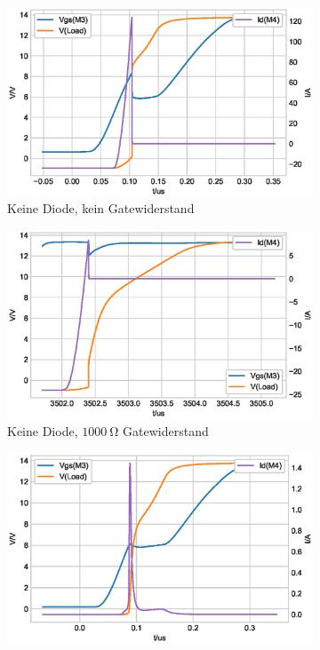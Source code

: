 \begin{figure}
     \centering
     \begin{subfigure}[t]{0.33\textwidth}
         \centering
         \includegraphics[width = \textwidth]{Bilder/NoDiode.eps}
         \caption{Keine Diode, kein Gatewiderstand}
     \end{subfigure}
     \begin{subfigure}[t]{0.33\textwidth}
         \centering
         \includegraphics[width = \textwidth]{Bilder/NoDiodeResistor.eps}
         \caption{Keine Diode, $\SI{1000}{\ohm}$ Gatewiderstand}
     \end{subfigure}
     \begin{subfigure}[t]{0.32\textwidth}
         \centering
         \includegraphics[width = \textwidth]{Bilder/Diode.eps}

\end{subfigure}
\end{figure}

